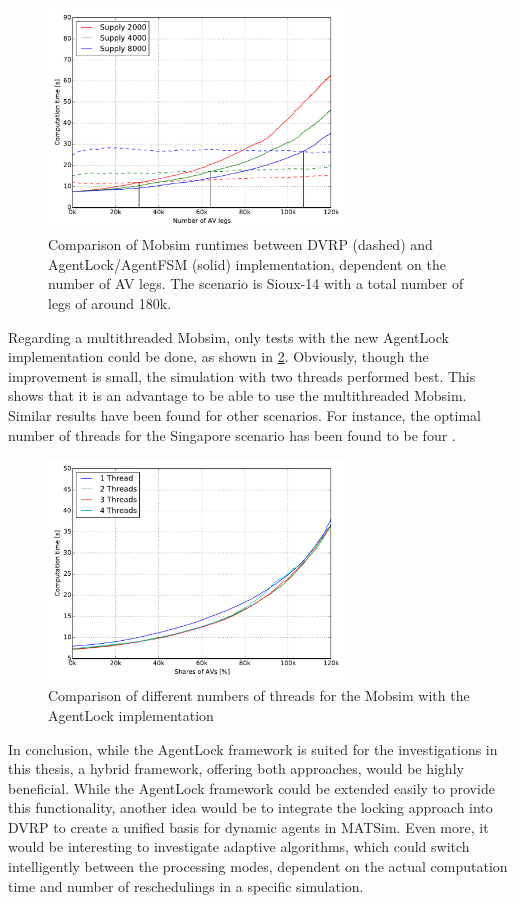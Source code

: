 \begin{figure}
    \centering
    \includegraphics[width=0.7\textwidth]{figures/dvrp_fsm.pdf}
    \caption{Comparison of Mobsim runtimes between DVRP (dashed) and AgentLock/AgentFSM (solid) implementation, dependent on the number of AV legs. The scenario is Sioux-14 with
    a total number of legs of around 180k.}
    \label{fig:dvrpfsm}
\end{figure}

Regarding a multithreaded Mobsim, only tests with the new AgentLock implementation
could be done, as shown in \cref{fig:threads}. Obviously, though the improvement
is small, the simulation with two threads performed best. This shows that it is
an advantage to be able to use the multithreaded Mobsim. Similar results
have been found for other scenarios. For instance, the optimal number of threads
for the Singapore scenario has been found to be four \citep{Erath2014}.

\begin{figure}
    \centering
    \includegraphics[width=0.7\textwidth]{figures/threads.pdf}
    \caption{Comparison of different numbers of threads for the Mobsim with the AgentLock implementation}
    \label{fig:threads}
\end{figure}

In conclusion, while the AgentLock framework is suited for the investigations in
this thesis, a hybrid framework, offering both approaches, would be highly beneficial.
While the AgentLock framework could be extended easily to provide this functionality,
another idea would be to integrate the locking approach into DVRP to create
a unified basis for dynamic agents in MATSim. Even more, it would be interesting
to investigate adaptive algorithms, which could switch intelligently between the
processing modes, dependent on the actual computation time and number of reschedulings
in a specific simulation.

